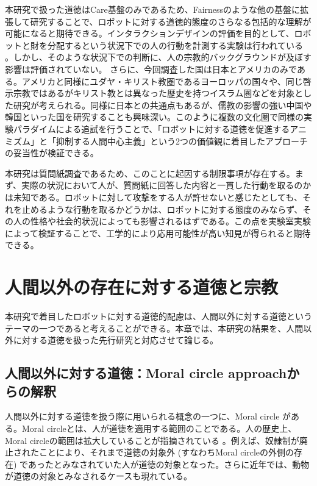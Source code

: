 \documentclass[a4j,12pt]{jreport}
\begin{document}
本研究で扱った道徳はCare基盤のみであるため、Fairnessのような他の基盤に拡張して研究することで、ロボットに対する道徳的態度のさらなる包括的な理解が可能になると期待できる。インタラクションデザインの評価を目的として、ロボットと財を分配するという状況下での人の行動を計測する実験は行われている\cite{fairness} 。しかし、そのような状況下での判断に、人の宗教的バックグラウンドが及ぼす影響は評価されていない。
さらに、今回調査した国は日本とアメリカのみである。アメリカと同様にユダヤ・キリスト教圏であるヨーロッパの国々や、同じ啓示宗教ではあるがキリスト教とは異なった歴史を持つイスラム圏などを対象とした研究が考えられる。同様に日本との共通点もあるが、儒教の影響の強い中国や韓国といった国を研究することも興味深い。このように複数の文化圏で同様の実験パラダイムによる追試を行うことで、「ロボットに対する道徳を促進するアニミズム」と「抑制する人間中心主義」という2つの価値観に着目したアプローチの妥当性が検証できる。



本研究は質問紙調査であるため、このことに起因する制限事項が存在する。まず、実際の状況において人が、質問紙に回答した内容と一貫した行動を取るのかは未知である。ロボットに対して攻撃をする人が許せないと感じたとしても、それを止めるような行動を取るかどうかは、ロボットに対する態度のみならず、その人の性格や社会的状況によっても影響されるはずである。この点を実験室実験によって検証することで、工学的により応用可能性が高い知見が得られると期待できる。



\newpage
\chapter{人間以外の存在に対する道徳と宗教}
本研究で着目したロボットに対する道徳的配慮は、人間以外に対する道徳というテーマの一つであると考えることができる。本章では、本研究の結果を、人間以外に対する道徳を扱った先行研究と対応させて論じる。

\section{人間以外に対する道徳：Moral circle approachからの解釈}
人間以外に対する道徳を扱う際に用いられる概念の一つに、Moral circle \cite{singer}がある。Moral circleとは、人が道徳を適用する範囲のことである。人の歴史上、Moral circleの範囲は拡大していることが指摘されている\cite{lecky, singer} 。例えば、奴隷制が廃止されたことにより、それまで道徳の対象外 (すなわちMoral circleの外側の存在) であったとみなされていた人が道徳の対象となった。さらに近年では、動物が道徳の対象とみなされるケースも現れている。
\end{document}
